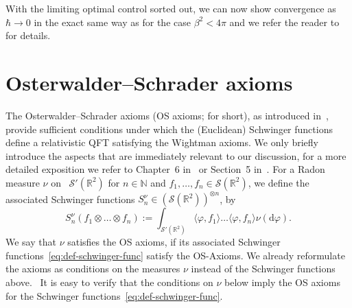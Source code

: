\documentclass[11pt, a4paper]{scrartcl}
\numberwithin{equation}{section}
\theoremstyle{plain}
\theoremstyle{remark}
\newcommand{\assign}{:=}
\newcommand{\mathd}{\mathrm{d}}
\begin{document}
With the limiting optimal control sorted out, we can now show convergence as
$\hbar \rightarrow 0$ in the exact same way as for the case $\beta^2 < 4 \pi$
and we refer the reader to~{\cite[Section
5]{barashkovStochasticControlApproach2022}} for details.

\section{Osterwalder--Schrader axioms}\label{sec:OS-Axioms}
The Osterwalder--Schrader axioms (OS axioms; for short), as introduced
in~{\cite{osterwalderAxiomsEuclideanGreens1973,osterwalderAxiomsEuclideanGreens1975}},
provide sufficient conditions under which the (Euclidean) Schwinger functions
define a relativistic QFT satisfying the Wightman axioms. We only briefly
introduce the aspects that are immediately relevant to our discussion, for a
more detailed exposition we refer to Chapter~6
in~{\cite{glimmQuantumPhysicsFunctional2012}} or Section~5
in~{\cite{gubinelliPDEConstructionEuclidean2021}}. For a Radon measure $\nu$
on \ $\mathcal{S}' (\mathbb{R}^2)$ for $n \in \mathbb{N}$ and $f_1, \ldots,
f_n \in \mathcal{S} (\mathbb{R}^2)$, we define the associated Schwinger
functions $S^{\nu}_n \in (\mathcal{S} (\mathbb{R}^2))^{\otimes n}$, by
\begin{equation}
  S^{\nu}_n (f_1 \otimes \ldots \otimes f_n) \assign \int_{\mathcal{S}'
  (\mathbb{R}^2)} \langle \varphi, f_1 \rangle \ldots \langle \varphi, f_n
  \rangle \nu (\mathd \varphi) . \label{eq:def-schwinger-func}
\end{equation}
We say that $\nu$ satisfies the OS axioms, if its associated Schwinger
functions~\eqref{eq:def-schwinger-func} satisfy the OS-Axioms. We already
reformulate the axioms as conditions on the measures $\nu$ instead of the
Schwinger functions above. \ It is easy to verify that the conditions on $\nu$
below imply the OS axioms for the Schwinger
functions~\eqref{eq:def-schwinger-func}.
\end{document}
